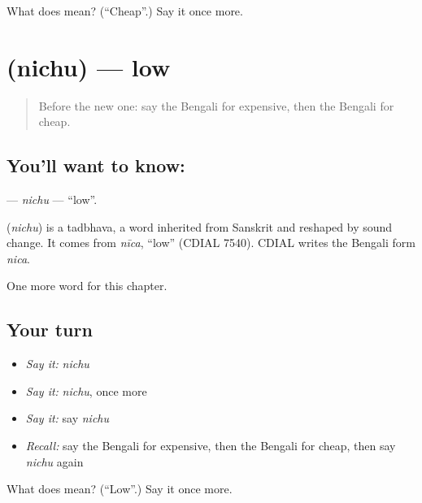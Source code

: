 \begin{tcolorbox}[breakable,colback=teal!4,colframe=teal!35!black,title={Before you move on}]
What does  mean? (\textquotedblleft{}Cheap\textquotedblright{}.) Say it once more.
\end{tcolorbox}
\section[\texorpdfstring{\bn{নিচু} (nichu)}{নিচু (nichu)}]{ (nichu) — low}

\label{lesson:BN-C74-nichu}



\begin{quote}
Before the new one: say the Bengali for expensive, then the Bengali for cheap.
\end{quote}

\subsection*{You'll want to know: }
\textbf{} — \emph{nichu} — \textquotedblleft{}low\textquotedblright{}.

\begin{cousinweb}
\textbf{} (\emph{nichu}) is a tadbhava, a word inherited from Sanskrit and reshaped by sound change. It comes from \emph{nīca}, \textquotedblleft{}low\textquotedblright{} (CDIAL 7540). CDIAL writes the Bengali form \emph{nica}.
\end{cousinweb}

\begin{grammarlens}[title={What you've built}]
One more word for this chapter.
\end{grammarlens}

\subsection*{Your turn}
\begin{itemize}
\raggedright
  \item \emph{Say it:} \emph{nichu}
  \item \emph{Say it:} \emph{nichu}, once more
  \item \emph{Say it:} say \emph{nichu}
  \item \emph{Recall:} say the Bengali for expensive, then the Bengali for cheap, then say \emph{nichu} again
\end{itemize}

\begin{tcolorbox}[breakable,colback=teal!4,colframe=teal!35!black,title={Before you move on}]
What does  mean? (\textquotedblleft{}Low\textquotedblright{}.) Say it once more.
\end{tcolorbox}
